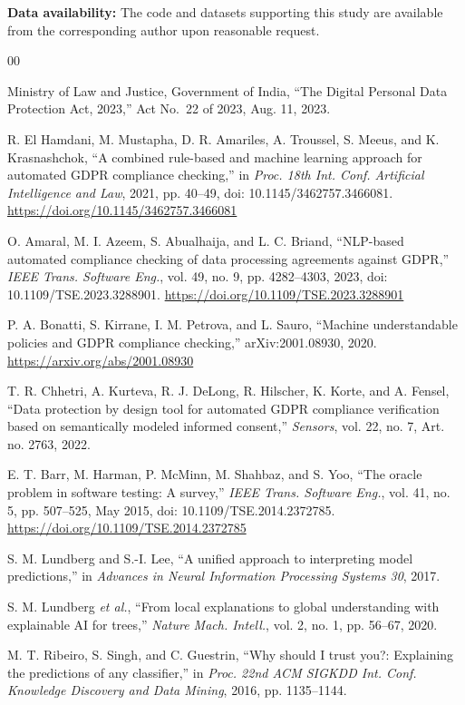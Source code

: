 \documentclass[11pt,a4paper]{article}
\begin{document}
\noindent\textbf{Data availability:} The code and datasets supporting this study are available from the corresponding author upon reasonable request.

\begin{thebibliography}{00}

Ministry of Law and Justice, Government of India, ``The Digital Personal Data Protection Act, 2023,'' Act No.~22 of 2023, Aug. 11, 2023.

R. El Hamdani, M. Mustapha, D. R. Amariles, A. Troussel, S. Meeus, and K. Krasnashchok, ``A combined rule-based and machine learning approach for automated GDPR compliance checking,'' in \emph{Proc. 18th Int. Conf. Artificial Intelligence and Law}, 2021, pp. 40--49, doi: 10.1145/3462757.3466081. \url{https://doi.org/10.1145/3462757.3466081}

O. Amaral, M. I. Azeem, S. Abualhaija, and L. C. Briand, ``NLP-based automated compliance checking of data processing agreements against GDPR,'' \emph{IEEE Trans. Software Eng.}, vol. 49, no. 9, pp. 4282--4303, 2023, doi: 10.1109/TSE.2023.3288901. \url{https://doi.org/10.1109/TSE.2023.3288901}

P. A. Bonatti, S. Kirrane, I. M. Petrova, and L. Sauro, ``Machine understandable policies and GDPR compliance checking,'' arXiv:2001.08930, 2020. \url{https://arxiv.org/abs/2001.08930}

T. R. Chhetri, A. Kurteva, R. J. DeLong, R. Hilscher, K. Korte, and A. Fensel, ``Data protection by design tool for automated GDPR compliance verification based on semantically modeled informed consent,'' \emph{Sensors}, vol. 22, no. 7, Art. no. 2763, 2022.

E. T. Barr, M. Harman, P. McMinn, M. Shahbaz, and S. Yoo, ``The oracle problem in software testing: A survey,'' \emph{IEEE Trans. Software Eng.}, vol. 41, no. 5, pp. 507--525, May 2015, doi: 10.1109/TSE.2014.2372785. \url{https://doi.org/10.1109/TSE.2014.2372785}

S. M. Lundberg and S.-I. Lee, ``A unified approach to interpreting model predictions,'' in \emph{Advances in Neural Information Processing Systems 30}, 2017.

S. M. Lundberg \emph{et al.}, ``From local explanations to global understanding with explainable AI for trees,'' \emph{Nature Mach. Intell.}, vol. 2, no. 1, pp. 56--67, 2020.

M. T. Ribeiro, S. Singh, and C. Guestrin, ``Why should I trust you?: Explaining the predictions of any classifier,'' in \emph{Proc. 22nd ACM SIGKDD Int. Conf. Knowledge Discovery and Data Mining}, 2016, pp. 1135--1144.


\end{thebibliography}
\end{document}
